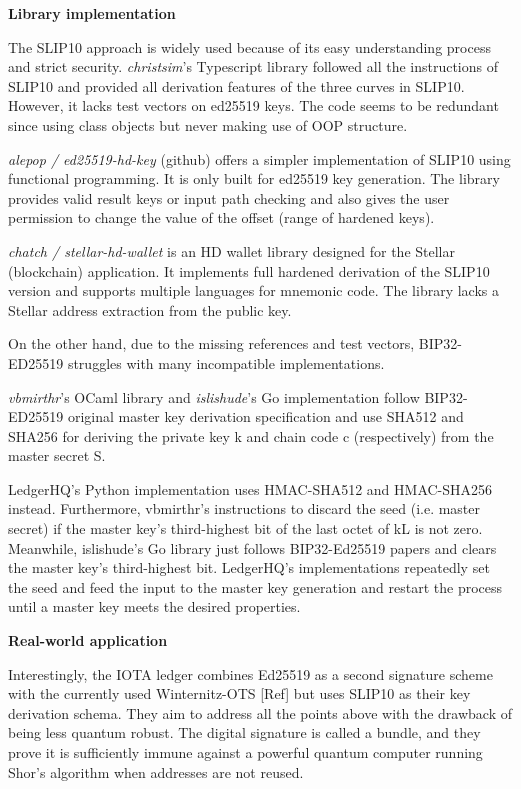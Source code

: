 \bigskip
{\textbf{Library implementation}}

The SLIP10 approach is widely used because of its easy understanding process and strict security. \textit{christsim}'s Typescript library \cite{christsim} followed all the instructions of SLIP10 and provided all derivation features of the three curves in SLIP10. However, it lacks test vectors on ed25519 keys. The code seems to be redundant since using class objects but never making use of OOP structure.

\textit{alepop / ed25519-hd-key} (github) \cite{alepop} offers a simpler implementation of SLIP10 using functional programming. It is only built for ed25519 key generation. The library provides valid result keys or input path checking and also gives the user permission to change the value of the offset (range of hardened keys).

\textit{chatch / stellar-hd-wallet} is an HD wallet library designed for the Stellar (blockchain) application. It implements full hardened derivation of the SLIP10 version and supports multiple languages for mnemonic code. The library lacks a Stellar address extraction from the public key.

On the other hand, due to the missing references and test vectors, BIP32-ED25519 struggles with many incompatible implementations.

\textit{vbmirthr}'s OCaml library \cite{vinc} and \textit{islishude}'s Go implementation \cite{Shude} follow BIP32-ED25519 original master key derivation specification and use SHA512 and SHA256 for deriving the private key k and chain code c (respectively) from the master secret S.

LedgerHQ's Python implementation \cite{LedgerHQ} uses HMAC-SHA512 and HMAC-SHA256 instead.
Furthermore, vbmirthr's instructions to discard the seed (i.e. master secret) if the master key's third-highest bit of the last octet of kL is not zero. Meanwhile, islishude's Go library just follows BIP32-Ed25519 papers and clears the master key's third-highest bit. LedgerHQ's implementations repeatedly set the seed and feed the input to the master key generation and restart the process until a master key meets the desired properties.


\bigskip
{\textbf{Real-world application}}

Interestingly, the IOTA ledger combines Ed25519 as a second signature scheme with the currently used Winternitz-OTS [Ref] but uses SLIP10 as their key derivation schema.
They aim to address all the points above with the drawback of being less quantum robust. The digital signature is called a bundle, and they prove it is sufficiently immune against a powerful quantum computer running Shor’s algorithm when addresses are not reused.

